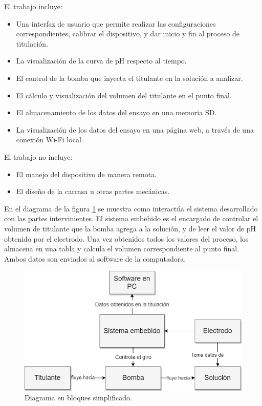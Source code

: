 El trabajo incluye:
\begin{itemize}
\item Una interfaz de usuario que permite realizar las configuraciones correspondientes, calibrar el dispositivo, y dar inicio y fin al proceso de titulación.
\item La visualización de la curva de pH respecto al tiempo.
\item El control de la bomba que inyecta el titulante en la solución a analizar.
\item El cálculo y visualización del volumen del titulante en el punto final.
\item El almacenamiento de los datos del ensayo en una memoria SD.
\item La visualización de los datos del ensayo en una página web, a través de una conexión Wi-Fi local.
\end{itemize}

El trabajo no incluye:
\begin{itemize}
\item El manejo del dispositivo de manera remota.
\item El diseño de la carcasa u otras partes mecánicas. 
\end{itemize}

En el diagrama de la figura \ref{fig:diagramaBloqueSimple} se muestra como interactúa el sistema desarrollado con las partes intervinientes. El sistema embebido es el encargado de controlar el volumen de titulante que la bomba agrega a la solución, y de leer el valor de pH obtenido por el electrodo. Una vez obtenidos todos los valores del proceso, los almacena en una tabla y calcula el volumen correspondiente al punto final. Ambos datos son enviados al software de la computadora.

\begin{figure}[htbp]
	\centering
	\includegraphics[width=.8\textwidth]{./Figures/DiagramaBloquesSimple.png}
	\caption{Diagrama en bloques simplificado.}
	\label{fig:diagramaBloqueSimple}
\end{figure}
